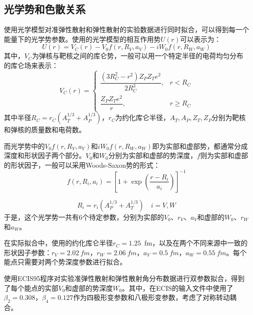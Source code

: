 \documentclass{npr}
\begin{document}
\subsection{光学势和色散关系}%
使用光学模型对准弹性散射和弹性散射的实验数据进行同时拟合，可以得到每一个能量下的光学势参数。使用的光学模型的相互作用势$U(r)$可以表示为：
\begin{equation}
U(r)= V_C(r) - V_0f(r,R_V,a_V) - iW_0f(r,R_W,a_W)
\label{opt}
\end{equation}
其中，$V_C$为弹核与靶核之间的库仑势，一般可以用一个特定半径的电荷均匀分布的库仑场来表示：
\begin{equation}
V_C(r) = 
\begin{cases} 
\dfrac{(3R_C^2 - r^2) Z_P Z_T e^2}{2R_C^3}, & r < R_C \\[1em]
\dfrac{Z_P Z_T e^2}{r}, & r \geq R_C 
\end{cases}
\end{equation}
其中半径$R_C=r_C(A_T^{1/3}+A_P^{1/3})$，$r_C$为约化库仑半径，$A_T,A_P,Z_T,Z_P$分别为靶核和弹核的质量数和电荷数。

而光学势中的$V_0f(r,R_V,a_V)$和$iW_0f(r,R_W,a_W)$即为实部和虚部势，都通常分成深度和形状因子两个部分。$V_0$和$W_0$分别为实部和虚部的势深度，$f$则为实部和虚部的形状因子，一般可以采用Woods-Saxon势的形式：
\begin{equation}
f(r, R_i, a_i) = \left[ 1 + \exp\left(\frac{r - R_i}{a_i}\right) \right]^{-1}
\end{equation}

\begin{equation}
R_i = r_i(A_P^{1/3} + A_T^{1/3}) \quad i = V, W
\end{equation}
于是，这个光学势一共有6个待定参数，分别为实部的$V_0$、$r_V$、$a_V$和虚部的$W_0$、$r_W$和$a_W$。

在实际拟合中，使用的约化库仑半径$r_C=1.25$~fm\cite{kim1979nuclear}，以及在两个不同来源中一致的形状因子参数：$r_V=2.02~fm$，$r_W=2.06~fm$，$a_V=0.5~fm$，$a_W=0.55~fm$\cite{kim1979nuclear,talon1981coulomb}。每个能点只需要对两个势深度参数进行拟合。

使用ECIS95程序对实验准弹性散射和弹性散射角分布数据进行双参数拟合\cite{raynal1994ecis}，得到了每个能点的实部$V_0$和虚部的势深度$W_0$。其中，在ECIS的输入文件中使用了$\beta_2 = 0.308$，$\beta_4 = 0.127$作为四极形变参数和八极形变参数，考虑了对称转动耦合。

\end{document}
